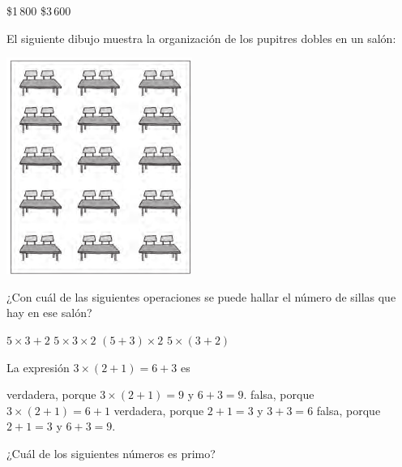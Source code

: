\documentclass[10pt,letterpaper,addpoints]{exam}
\begin{document}
\begin{multicols}{2}
\begin{questions}
\begin{multicols}{2}
\begin{choices}
\choice \$1\,800
\choice \$3\,600
\end{choices}
\end{multicols}
\question El siguiente dibujo muestra la organización de los pupitres dobles en un salón:
\begin{center}
\includegraphics[scale=.75]{Images/sillas.png} 
\end{center}
¿Con cuál de las siguientes operaciones se puede hallar el número de sillas que hay en ese   salón?
\begin{multicols}{2}
\begin{choices}
\choice $5\times 3+2$
\CorrectChoice $5\times 3 \times 2$
\choice $(5+3)\times 2$
\choice $5\times (3+2)$
\end{choices}
\end{multicols}
\question La expresión $3\times (2+1)=6+3$ es
\begin{choices}
\CorrectChoice verdadera, porque $3\times (2+1)=9$ y $6+3=9$.
\choice falsa, porque $3\times (2+1)=6+1$
\choice verdadera, porque $2+1=3$ y $3+3=6$
\choice falsa, porque $2+1=3$ y $6+3=9$.
\end{choices}
\question ¿Cuál de los siguientes números es primo?


\end{questions}
\end{multicols}
\end{document}
